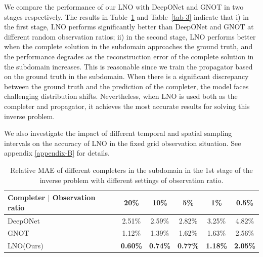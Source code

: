 \documentclass{article}
\begin{document}
We compare the performance of our LNO with DeepONet\cite{DeepONet} and GNOT\cite{GNOT} in two stages respectively. The results in Table~\ref{tab-2} and Table~\ref{tab-3} indicate that i) in the first stage, LNO performs significantly better than DeepONet and GNOT at different random observation ratios; ii) in the second stage, LNO performs better when the complete solution in the subdomain approaches the ground truth, and the performance degrades as the reconstruction error of the complete solution in the subdomain increases. This is reasonable since we train the propagator based on the ground truth in the subdomain. When there is a significant discrepancy between the ground truth and the prediction of the completer, the model faces challenging distribution shifts. Nevertheless, when LNO is used both as the completer and propagator, it achieves the most accurate results for solving this inverse problem. 

We also investigate the impact of different temporal and spatial sampling intervals on the accuracy of LNO  in the fixed grid observation situation. See appendix \ref{appendix-B} for details.

\begin{table}[htbp]
\centering
\caption{Relative MAE of different completers in the subdomain in the 1st stage of the inverse problem with different settings of observation ratio. }
\label{tab-2}
\begin{tabular}{lccccc}
\toprule
Completer $|$ Observation ratio &20\%&10\%&5\%&1\%&0.5\%  \\
\midrule
DeepONet\cite{DeepONet}&2.51\%&2.59\%&2.82\%&3.25\%&4.82\%\\
GNOT\cite{GNOT}&1.12\%&1.39\%&1.62\%&1.63\%&2.56\%\\
LNO(Ours)&\textbf{0.60\%}&\textbf{0.74\%}&\textbf{0.77\%}&\textbf{1.18\%}&\textbf{2.05\%}\\
\bottomrule
\end{tabular}
\end{table}
\end{document}
